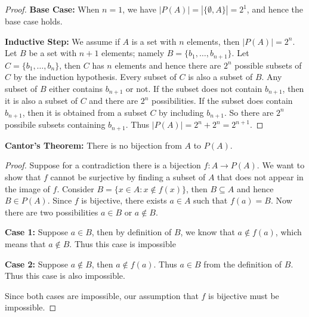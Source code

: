 \documentclass[12pt,letterpaper]{article}
\begin{document}
\begin{enumerate}
\begin{proof}
  {\bf Base Case:} When $n=1$, we have $|P(A)|=|\{\emptyset,A \}|=2^1$, and hence the base case holds.
  
  {\bf Inductive Step:} We assume if $A$ is a set with $n$ elements, then $|P(A)|=2^n$. Let $B$ be a set with $n+1$ elements; namely $B=\{b_1, \dots, b_{n+1}\}$. Let $C=\{b_1, \dots, b_n \}$, then $C$ has $n$ elements and hence there are $2^n$ possible subsets of $C$ by the induction hypothesis. Every subset of $C$ is also a subset of $B$.
  Any subset of $B$ either contains $b_{n+1}$ or not. If the subset does not contain $b_{n+1}$, then it is also a subset of $C$ and there are $2^n$ possibilities. If the subset does contain $b_{n+1}$, then it is obtained from a subset $C$ by including $b_{n+1}$. So there are $2^n$ possibile subsets containing $b_{n+1}$. Thus $|P(A)|=2^n+2^n=2^{n+1}$.
  \end{proof}
  
  \Answer 
  
  {\bf Cantor's Theorem:} There is no bijection from $A$ to $P(A)$.
  
  \begin{proof}
  	Suppose for a contradiction there is a bijection $f:A\to P(A)$. We want to show that $f$ cannot be surjective by finding a subset of $A$ that does not appear in the image of $f$. Consider $B=\{x \in A: x \not \in f(x) \}$, then $B\subseteq A$ and hence $B \in P(A)$. Since $f$ is bijective, there exists $a \in A$ such that $f(a)=B$. Now there are two possibilities $a \in B$ or $a \not \in B$.
  	
  	{\bf Case 1:} Suppose $a\in B$, then by definition of $B$, we know that $a \not \in f(a)$, which means that $a \not \in B$. Thus this case is impossible 
  	
  	{\bf Case 2:} Suppose $a \not \in B$, then $a \not \in f(a)$. Thus $a \in B$ from the definition of $B$. Thus this case is also impossible.
  	
  	Since both cases are impossible, our assumption that $f$ is bijective must be impossible.
  \end{proof}
  
\end{enumerate}
\end{document}
